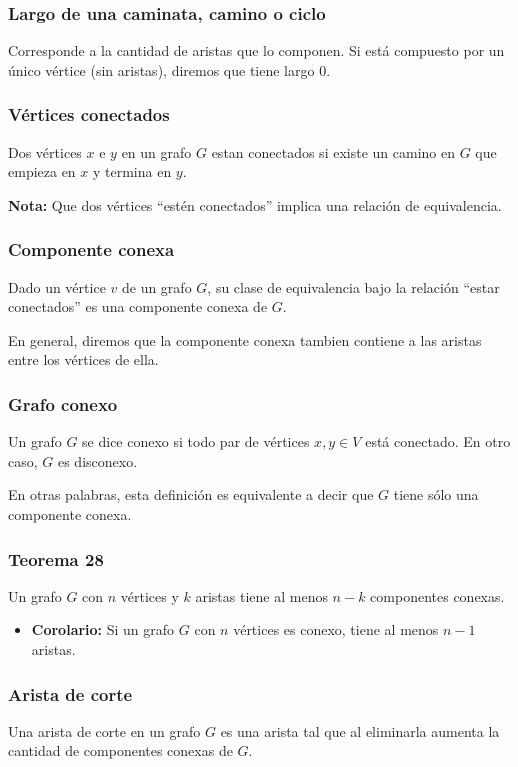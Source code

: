 \begin{multicols}{2}
    \subsubsection*{Largo de una caminata, camino o ciclo}
    Corresponde a la cantidad de aristas que lo componen. Si está compuesto por un único vértice (sin aristas), diremos que tiene largo 0.
    
    \subsubsection*{Vértices conectados}
    Dos vértices $x$ e $y$ en un grafo $G$ estan conectados si existe un camino en $G$ que empieza en $x$ y termina en $y$. \p
    
    \textbf{Nota:} Que dos vértices ``estén conectados'' implica una relación de equivalencia.
    
    \subsubsection*{Componente conexa}
    Dado un vértice $v$ de un grafo $G$, su clase de equivalencia bajo la relación ``estar conectados'' es una componente conexa de $G$. \p
    
    En general, diremos que la componente conexa tambien contiene a las aristas entre los vértices de ella.
    
    \subsubsection*{Grafo conexo}
    Un grafo $G$ se dice conexo si todo par de vértices $x,y \in V$ está conectado. En otro caso, $G$ es disconexo. \p
    
    En otras palabras, esta definición es equivalente a decir que $G$ tiene sólo una componente conexa.
    
    \subsubsection*{Teorema 28}
    Un grafo $G$ con $n$ vértices y $k$ aristas tiene al menos $n - k$ componentes conexas.
    \begin{itemize}
        \item \textbf{Corolario:} Si un grafo $G$ con $n$ vértices es conexo, tiene al menos $n - 1$ aristas.
    \end{itemize}
    
    \subsubsection*{Arista de corte}
    Una arista de corte en un grafo $G$ es una arista tal que al eliminarla aumenta la cantidad de componentes conexas de $G$.
    

\end{multicols}
